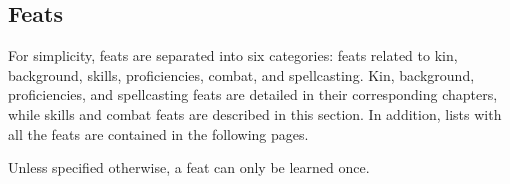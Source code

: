 \subsection*{Feats} \label{ssec::feats}
For simplicity, feats are separated into six categories: feats related to kin, background, skills, proficiencies, combat, and spellcasting.
Kin, background, proficiencies, and spellcasting feats are detailed in their corresponding chapters, while skills and combat feats are described in this section.
In addition, lists with all the feats are contained in the following pages.

Unless specified otherwise, a feat can only be learned once.



